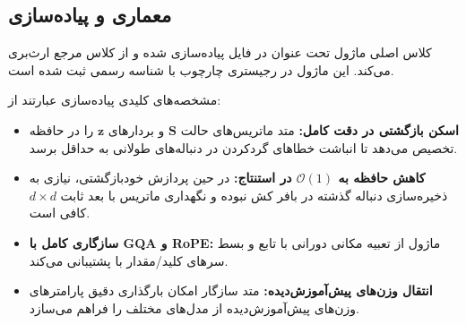 \subsection{معماری و پیاده‌سازی}
کلاس اصلی ماژول تحت عنوان  در فایل  پیاده‌سازی شده و از کلاس مرجع  ارث‌بری می‌کند. این ماژول در رجیستری چارچوب با شناسه رسمی  ثبت شده است.

مشخصه‌های کلیدی پیاده‌سازی عبارتند از:
\begin{itemize}
    \item \textbf{اسکن بازگشتی در دقت کامل:} متد  ماتریس‌های حالت $\mathbf{S}$ و بردارهای $\mathbf{z}$ را در حافظه  تخصیص می‌دهد تا انباشت خطاهای گردکردن در دنباله‌های طولانی به حداقل برسد.
    \item \textbf{کاهش حافظه به $\mathcal{O}(1)$ در استنتاج:} در حین پردازش خودبازگشتی، نیازی به ذخیره‌سازی دنباله گذشته در بافر کش  نبوده و نگهداری ماتریس با بعد ثابت $d \times d$ کافی است.
    \item \textbf{سازگاری کامل با GQA و RoPE:} ماژول از تعبیه مکانی دورانی با تابع  و بسط سرهای کلید/مقدار با  پشتیبانی می‌کند.
    \item \textbf{انتقال وزن‌های پیش‌آموزش‌دیده:} متد سازگار  امکان بارگذاری دقیق پارامترهای وزن‌های پیش‌آموزش‌دیده از مدل‌های مختلف را فراهم می‌سازد.
\end{itemize}
